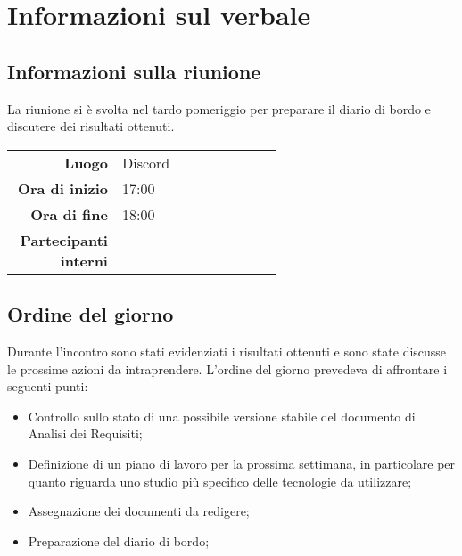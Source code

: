 \section{Informazioni sul verbale}

\subsection{Informazioni sulla riunione}
La riunione si è svolta nel tardo pomeriggio per preparare il diario di bordo e discutere dei risultati ottenuti.

\begin{center}
	\begin{tabular}{r|p{0.6\linewidth}}
		\toprule
		\textbf{Luogo} & Discord \\
		\textbf{Ora di inizio} & 17:00 \\
		\textbf{Ora di fine} & 18:00 \\
		\textbf{Partecipanti interni} & \groupTeam
	\end{tabular}
\end{center}

\medskip

\subsection{Ordine del giorno}
Durante l'incontro sono stati evidenziati i risultati ottenuti e sono state discusse le prossime azioni da intraprendere. L'ordine del giorno prevedeva di affrontare i seguenti punti:
\begin{itemize}
	\item Controllo sullo stato di una possibile versione stabile del documento di Analisi dei Requisiti;
	\item Definizione di un piano di lavoro per la prossima settimana, in particolare per quanto riguarda uno studio più specifico delle tecnologie da utilizzare;
	\item Assegnazione dei documenti da redigere;
	\item Preparazione del diario di bordo;
\end{itemize}
